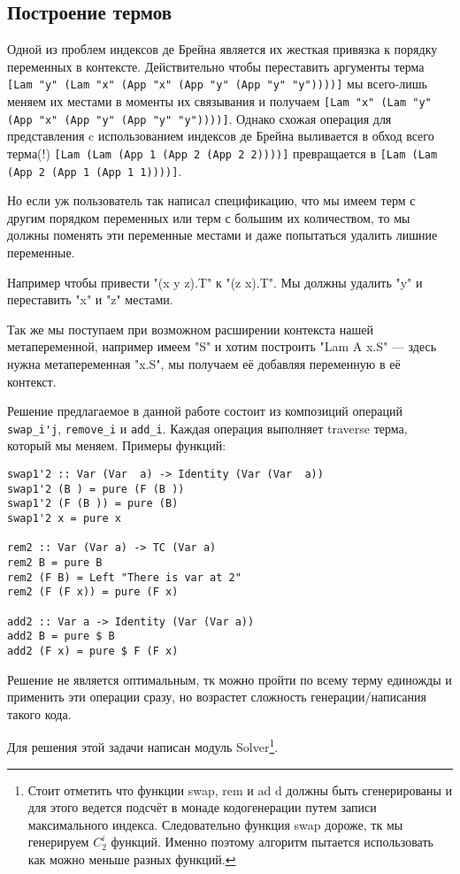 \subsection{Построение термов}\label{build_exp}
Одной из проблем индексов де Брейна является их жесткая привязка к порядку переменных в контексте. Действительно чтобы переставить аргументы терма \lstinline{[Lam "y" (Lam "x" (App "x" (App "y" (App "y" "y"))))]} мы всего-лишь меняем их местами в моменты их связывания и получаем \lstinline{[Lam "x" (Lam "y" (App "x" (App "y" (App "y" "y"))))]}. Однако схожая операция для представления c использованием индексов де Брейна выливается в обход всего терма(!) \lstinline{[Lam (Lam (App 1 (App 2 (App 2 2))))]} превращается в \lstinline{[Lam (Lam (App 2 (App 1 (App 1 1))))]}.

Но если уж пользователь так написал спецификацию, что мы имеем терм с другим порядком переменных или терм с большим их количеством, то мы должны поменять эти переменные местами и даже попытаться удалить лишние переменные.

Например чтобы привести "(x y z).T" к "(z x).T". Мы должны удалить "y" и переставить "x" и "z" местами.

Так же мы поступаем при возможном расширении контекста нашей метапеременной, например имеем "S" и хотим построить "Lam A x.S" --- здесь нужна метапеременная "x.S", мы получаем её добавляя переменную в её контекст.

Решение предлагаемое в данной работе состоит из композиций операций \lstinline{swap_i'j}, \lstinline{remove_i} и \lstinline{add_i}. Каждая операция выполняет traverse терма, который мы меняем. Примеры функций:
\begin{lstlisting}
swap1'2 :: Var (Var  a) -> Identity (Var (Var  a))
swap1'2 (B ) = pure (F (B ))
swap1'2 (F (B )) = pure (B)
swap1'2 x = pure x

rem2 :: Var (Var a) -> TC (Var a)
rem2 B = pure B
rem2 (F B) = Left "There is var at 2"
rem2 (F (F x)) = pure (F x)

add2 :: Var a -> Identity (Var (Var a))
add2 B = pure $ B
add2 (F x) = pure $ F (F x)
\end{lstlisting}

Решение не является оптимальным, тк можно пройти по всему терму единожды и применить эти операции сразу, но возрастет сложность генерации/написания такого кода.

Для решения этой задачи написан модуль Solver\footnote{Стоит отметить что функции swap, rem и ad  d должны быть сгенерированы и для этого ведется подсчёт в монаде кодогенерации путем записи максимального индекса. Следовательно функция swap дороже, тк мы генерируем $C_2^i$ функций. Именно поэтому алгоритм пытается использовать как можно меньше разных функций.}.

